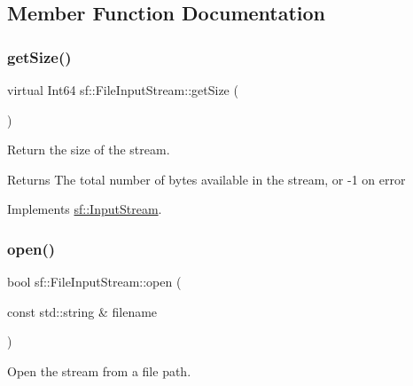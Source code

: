 \subsection{Member Function Documentation}
\mbox{\label{classsf_1_1_file_input_stream_aabdcaa315e088e008eeb9711ecc796e8}} 
\subsubsection{\texorpdfstring{getSize()}{getSize()}}
{\footnotesize\ttfamily virtual Int64 sf\+::\+File\+Input\+Stream\+::get\+Size (\begin{DoxyParamCaption}{ }\end{DoxyParamCaption})\hspace{0.3cm}{\ttfamily [virtual]}}



Return the size of the stream. 

\begin{DoxyReturn}{Returns}
The total number of bytes available in the stream, or -\/1 on error \begin{DoxyVerb}\end{DoxyVerb}
 
\end{DoxyReturn}


Implements \mbox{\hyperlink{classsf_1_1_input_stream_a311eaaaa65d636728e5153b574b72d5d}{sf\+::\+Input\+Stream}}.

\mbox{\label{classsf_1_1_file_input_stream_a87a95dc3a71746097a99c86ee58bb353}} 
\subsubsection{\texorpdfstring{open()}{open()}}
{\footnotesize\ttfamily bool sf\+::\+File\+Input\+Stream\+::open (\begin{DoxyParamCaption}\item[{const std\+::string \&}]{filename }\end{DoxyParamCaption})}



Open the stream from a file path. 


